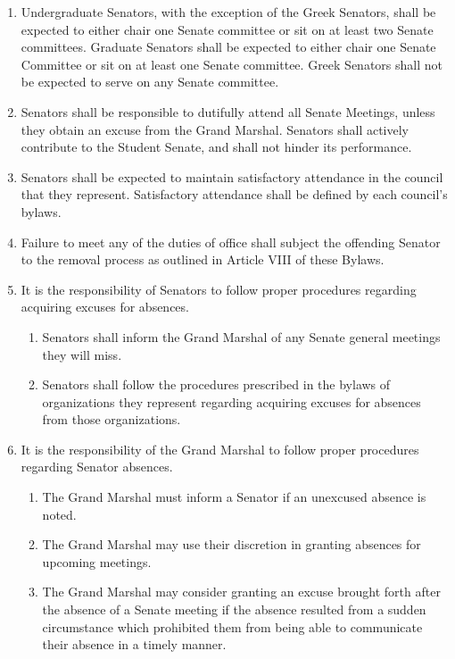 \documentclass{uniondoc}
\begin{document}
\begin{enumerate}
	\item Undergraduate Senators, with the exception of the Greek Senators, shall be expected to either chair one Senate committee or sit on at least two Senate committees.
	      Graduate Senators shall be expected to either chair one Senate Committee or sit on at least one Senate committee.
	      Greek Senators shall not be expected to serve on any Senate committee.
	\item Senators shall be responsible to dutifully attend all Senate Meetings, unless they obtain an excuse from the Grand Marshal.
	      Senators shall actively contribute to the Student Senate,
	      and shall not hinder its performance.
	\item Senators shall be expected to maintain satisfactory attendance in the council that they represent.
	      Satisfactory attendance shall be defined by each council’s bylaws.
	\item Failure to meet any of the duties of office shall subject the offending Senator to the removal process as outlined in Article VIII of these Bylaws.
	\item It is the responsibility of Senators to follow proper procedures regarding acquiring excuses for absences.
	      \begin{enumerate}
		      \item Senators shall inform the Grand Marshal of any Senate general meetings they will miss.
		      \item Senators shall follow the procedures prescribed in the bylaws of organizations they represent regarding acquiring excuses for absences from those organizations.
	      \end{enumerate}
	\item It is the responsibility of the Grand Marshal to follow proper procedures regarding Senator absences.
	      \begin{enumerate}
		      \item The Grand Marshal must inform a Senator if an unexcused absence is noted.
		      \item The Grand Marshal may use their discretion in granting absences for upcoming meetings.
		      \item The Grand Marshal may consider granting an excuse brought forth after the absence of a Senate meeting if the absence resulted from a sudden circumstance which prohibited them from being able to communicate their absence in a timely manner.
	      \end{enumerate}
\end{enumerate}
\end{document}

